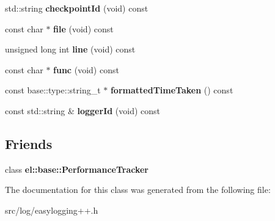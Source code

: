 \begin{DoxyCompactItemize}
\item 
std\+::string {\bfseries checkpoint\+Id} (void) const \hypertarget{classel_1_1PerformanceTrackingData_a17c92b7a9ea243eb37f3fa903ce6e06d}{}\label{classel_1_1PerformanceTrackingData_a17c92b7a9ea243eb37f3fa903ce6e06d}

\item 
const char $\ast$ {\bfseries file} (void) const \hypertarget{classel_1_1PerformanceTrackingData_a51512448de4eb220514f193a2fc14849}{}\label{classel_1_1PerformanceTrackingData_a51512448de4eb220514f193a2fc14849}

\item 
unsigned long int {\bfseries line} (void) const \hypertarget{classel_1_1PerformanceTrackingData_a82529dd8d0c92bf377ec269cb4f69a45}{}\label{classel_1_1PerformanceTrackingData_a82529dd8d0c92bf377ec269cb4f69a45}

\item 
const char $\ast$ {\bfseries func} (void) const \hypertarget{classel_1_1PerformanceTrackingData_a12fe4fe91e83cbff7d5bb4736176ec30}{}\label{classel_1_1PerformanceTrackingData_a12fe4fe91e83cbff7d5bb4736176ec30}

\item 
const base\+::type\+::string\+\_\+t $\ast$ {\bfseries formatted\+Time\+Taken} () const \hypertarget{classel_1_1PerformanceTrackingData_a44a4c82d400155bd147eb455025c88fc}{}\label{classel_1_1PerformanceTrackingData_a44a4c82d400155bd147eb455025c88fc}

\item 
const std\+::string \& {\bfseries logger\+Id} (void) const \hypertarget{classel_1_1PerformanceTrackingData_ae8ad846d155762ae7cab3fb67760f5a1}{}\label{classel_1_1PerformanceTrackingData_ae8ad846d155762ae7cab3fb67760f5a1}

\end{DoxyCompactItemize}
\subsection*{Friends}
\begin{DoxyCompactItemize}
\item 
class {\bfseries el\+::base\+::\+Performance\+Tracker}\hypertarget{classel_1_1PerformanceTrackingData_a6a4d7851e1984800be3c230f06a79528}{}\label{classel_1_1PerformanceTrackingData_a6a4d7851e1984800be3c230f06a79528}

\end{DoxyCompactItemize}


The documentation for this class was generated from the following file\+:\begin{DoxyCompactItemize}
\item 
src/log/easylogging++.\+h\end{DoxyCompactItemize}
